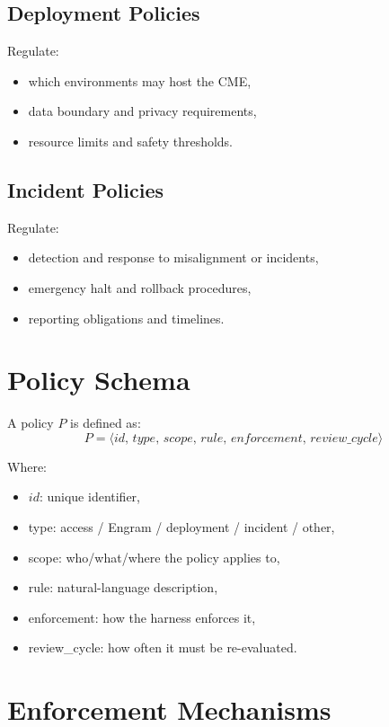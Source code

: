 \subsection{Deployment Policies}

Regulate:
\begin{itemize}
    \item which environments may host the CME,
    \item data boundary and privacy requirements,
    \item resource limits and safety thresholds.
\end{itemize}

\subsection{Incident Policies}

Regulate:
\begin{itemize}
    \item detection and response to misalignment or incidents,
    \item emergency halt and rollback procedures,
    \item reporting obligations and timelines.
\end{itemize}

\section{Policy Schema}

A policy $P$ is defined as:
\[
P = \langle id,\, type,\, scope,\, rule,\, enforcement,\, review\_cycle \rangle
\]

Where:
\begin{itemize}
    \item $id$: unique identifier,
    \item type: access / Engram / deployment / incident / other,
    \item scope: who/what/where the policy applies to,
    \item rule: natural-language description,
    \item enforcement: how the harness enforces it,
    \item review\_cycle: how often it must be re-evaluated.
\end{itemize}

\section{Enforcement Mechanisms}


